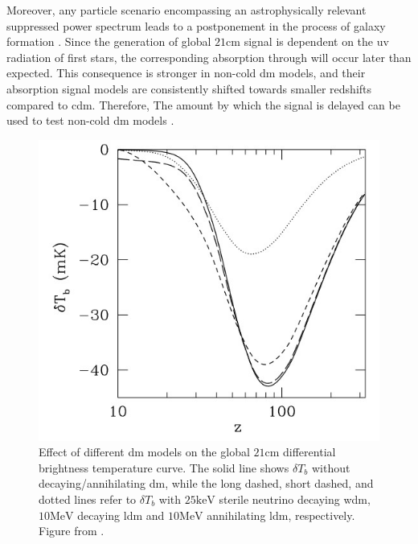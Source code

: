 \documentclass[12pt, TexShade, letterpaper]{report}
\begin{document}
Moreover, any particle  scenario encompassing an astrophysically relevant suppressed power spectrum leads to a postponement in the process of galaxy formation \cite{noncold_dm_21}. Since the generation of global $\mathrm{21cm}$ signal is dependent on the \gls{uv} radiation of first stars, the corresponding absorption through will occur later than expected. This consequence is stronger in non-cold \gls{dm} models, and their absorption signal models are consistently shifted towards smaller redshifts compared to \gls{cdm}. Therefore, The amount by which the signal is delayed can be used to test non-cold \gls{dm} models  \cite{first_star_impact, dm_timing}.\par 

\begin{figure}[h!]
    \centering
    \includegraphics{21cm_dm.jpg}
    \caption[Effect of different \gls{dm} models on the global $\mathrm{21cm}$ differential brightness temperature curve]{Effect of different \gls{dm} models on the global $\mathrm{21cm}$ differential brightness temperature curve. The solid line shows $\delta T_b$ without decaying/annihilating \gls{dm}, while the long dashed, short dashed, and dotted lines refer to $\delta T_b$ with $\mathrm{25keV}$ sterile neutrino decaying \gls{wdm}, $\mathrm{10 MeV}$ decaying \gls{ldm} and $\mathrm{10MeV}$ annihilating \gls{ldm}, respectively. Figure from \cite{constrain_dm_21}.}
    \label{fig:enter-label}
\end{figure}
\end{document}
